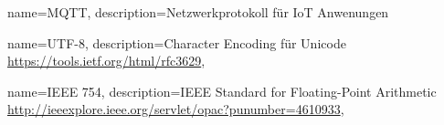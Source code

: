 




{
    name=MQTT,
    description={Netzwerkprotokoll für IoT Anwenungen}
}







{
    name=UTF-8,
    description={Character Encoding für Unicode \url{https://tools.ietf.org/html/rfc3629}}, 
}

{
    name=IEEE 754,
    description={IEEE Standard for Floating-Point Arithmetic   \url{http://ieeexplore.ieee.org/servlet/opac?punumber=4610933}}, 
}


